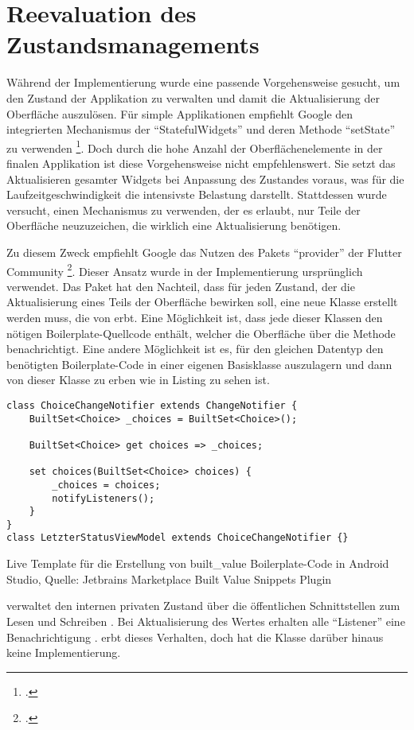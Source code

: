  
\section{Reevaluation des Zustandsmanagements}
\label{sec:Reevaluation-des-Zustandsmanagements}


Während der Implementierung wurde eine passende Vorgehensweise gesucht,
um den Zustand der Applikation zu verwalten
und damit die Aktualisierung der Oberfläche auszulösen.
Für simple Applikationen empfiehlt Google den integrierten Mechanismus der \enquote{StatefulWidgets} und deren Methode \enquote{setState} zu verwenden \footcite[Vgl.][]{AddingInteractivityToYourFlutterApp}.
Doch durch die hohe Anzahl der Oberflächenelemente in der finalen Applikation ist diese Vorgehensweise nicht empfehlenswert.
Sie setzt das Aktualisieren gesamter Widgets bei Anpassung des Zustandes voraus,
was für die Laufzeitgeschwindigkeit die intensivste Belastung darstellt.
Stattdessen wurde versucht,
einen Mechanismus zu verwenden,
der es erlaubt,
nur Teile der Oberfläche neuzuzeichen,
die wirklich eine Aktualisierung benötigen.

Zu diesem Zweck empfiehlt Google das Nutzen des Pakets \enquote{provider} der Flutter Community \footcite[Vgl.][]{ProviderARecommendedApproach}.
Dieser Ansatz wurde in der Implementierung ursprünglich verwendet.
Das Paket hat den Nachteil,
dass für jeden Zustand,
der die Aktualisierung eines Teils der Oberfläche bewirken soll,
eine neue Klasse erstellt werden muss, die von  erbt.
Eine Möglichkeit ist,
dass jede dieser Klassen den nötigen Boilerplate-Quellcode enthält,
welcher die Oberfläche über die Methode  benachrichtigt.
Eine andere Möglichkeit ist es, für den gleichen Datentyp den benötigten Boilerplate-Code in einer eigenen Basisklasse auszulagern
und dann von dieser Klasse zu erben wie in Listing \label{lst:ChoiceChangeNotifier} zu sehen ist.
\ifIncludeFigures
  \begin{listing}[h]
    \begin{verbatim}
class ChoiceChangeNotifier extends ChangeNotifier {
    BuiltSet<Choice> _choices = BuiltSet<Choice>();

    BuiltSet<Choice> get choices => _choices;

    set choices(BuiltSet<Choice> choices) {
        _choices = choices;
        notifyListeners();
    }
}
class LetzterStatusViewModel extends ChoiceChangeNotifier {}
\end{verbatim}
    \caption[built_value Live Template]{Live Template für die Erstellung von built_value Boilerplate-Code in Android Studio, Quelle: Jetbrains Marketplace Built Value Snippets Plugin}
    \label{lst:ChoiceChangeNotifier}
  \end{listing}
\fi
{} verwaltet den internen privaten Zustand   über die öffentlichen Schnittstellen zum Lesen  und Schreiben .
Bei Aktualisierung des Wertes erhalten alle \enquote{Listener} eine Benachrichtigung .
 erbt dieses Verhalten, doch hat die Klasse darüber hinaus keine Implementierung.

